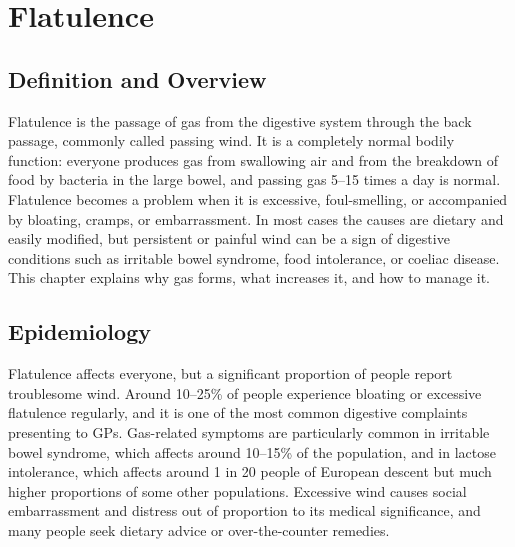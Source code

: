 \chapter{Flatulence}

\section*{Definition and Overview}
Flatulence is the passage of gas from the digestive system through the back passage, commonly called passing wind. It is a completely normal bodily function: everyone produces gas from swallowing air and from the breakdown of food by bacteria in the large bowel, and passing gas 5--15 times a day is normal. Flatulence becomes a problem when it is excessive, foul-smelling, or accompanied by bloating, cramps, or embarrassment. In most cases the causes are dietary and easily modified, but persistent or painful wind can be a sign of digestive conditions such as irritable bowel syndrome, food intolerance, or coeliac disease. This chapter explains why gas forms, what increases it, and how to manage it.

\section*{Epidemiology}
Flatulence affects everyone, but a significant proportion of people report troublesome wind. Around 10--25\% of people experience bloating or excessive flatulence regularly, and it is one of the most common digestive complaints presenting to GPs. Gas-related symptoms are particularly common in irritable bowel syndrome, which affects around 10--15\% of the population, and in lactose intolerance, which affects around 1 in 20 people of European descent but much higher proportions of some other populations. Excessive wind causes social embarrassment and distress out of proportion to its medical significance, and many people seek dietary advice or over-the-counter remedies.

